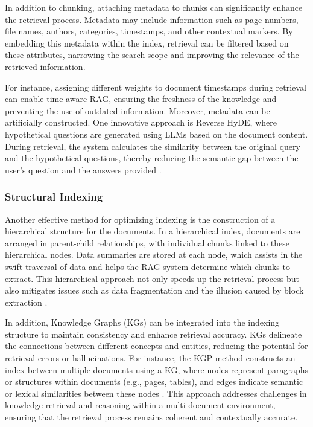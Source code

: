 In addition to chunking, attaching metadata to chunks can significantly enhance the retrieval process. Metadata may include information such as page numbers, file names, authors, categories, timestamps, and other contextual markers. By embedding this metadata within the index, retrieval can be filtered based on these attributes, narrowing the search scope and improving the relevance of the retrieved information. 

For instance, assigning different weights to document timestamps during retrieval can enable time-aware RAG, ensuring the freshness of the knowledge and preventing the use of outdated information. Moreover, metadata can be artificially constructed. One innovative approach is Reverse HyDE, where hypothetical questions are generated using LLMs based on the document content. During retrieval, the system calculates the similarity between the original query and the hypothetical questions, thereby reducing the semantic gap between the user's question and the answers provided \cite{gao2023retrieval}.

\subsubsection{Structural Indexing}

Another effective method for optimizing indexing is the construction of a hierarchical structure for the documents. In a hierarchical index, documents are arranged in parent-child relationships, with individual chunks linked to these hierarchical nodes. Data summaries are stored at each node, which assists in the swift traversal of data and helps the RAG system determine which chunks to extract. This hierarchical approach not only speeds up the retrieval process but also mitigates issues such as data fragmentation and the illusion caused by block extraction \cite{gao2023retrieval}.

In addition, Knowledge Graphs (KGs) can be integrated into the indexing structure to maintain consistency and enhance retrieval accuracy. KGs delineate the connections between different concepts and entities, reducing the potential for retrieval errors or hallucinations. For instance, the KGP method constructs an index between multiple documents using a KG, where nodes represent paragraphs or structures within documents (e.g., pages, tables), and edges indicate semantic or lexical similarities between these nodes \cite{wang2024knowledge}. This approach addresses challenges in knowledge retrieval and reasoning within a multi-document environment, ensuring that the retrieval process remains coherent and contextually accurate.

